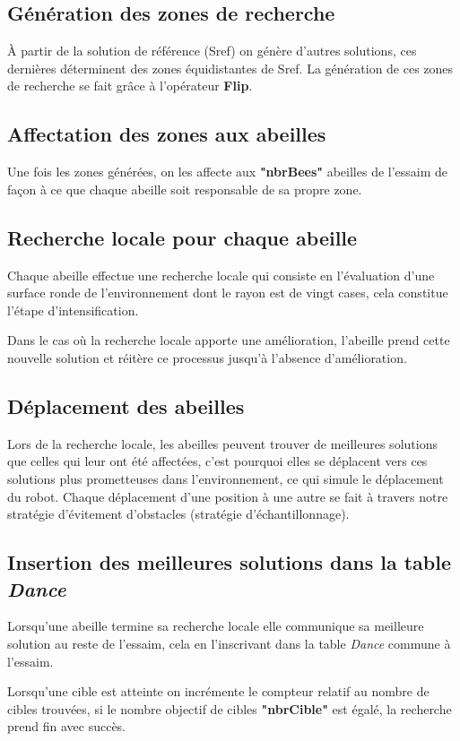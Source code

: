 \subsection{Génération des zones de recherche}
À partir de la solution de référence (Sref) on génère d'autres solutions, ces dernières déterminent des zones équidistantes de Sref. La génération de ces zones de recherche se fait grâce à l'opérateur \textbf{Flip}. 

\subsection{Affectation des zones aux abeilles}
Une fois les zones générées, on les affecte aux \textbf{"nbrBees"} abeilles de l'essaim de façon à ce que chaque abeille soit responsable de sa propre zone. 

\subsection{Recherche locale pour chaque abeille} 
Chaque abeille effectue une recherche locale qui consiste en l'évaluation d'une surface ronde de l'environnement dont le rayon est de vingt cases, cela constitue l'étape d'intensification. 

Dans le cas où la recherche locale apporte une amélioration, l'abeille prend cette nouvelle solution et réitère ce processus jusqu'à l'absence d'amélioration.

\subsection{Déplacement des abeilles}
Lors de la recherche locale, les abeilles peuvent trouver de meilleures solutions que celles qui leur ont été affectées, c'est pourquoi elles se déplacent vers ces solutions plus prometteuses dans l'environnement, ce qui simule le déplacement du robot. Chaque déplacement d'une position à une autre se fait à travers notre stratégie d'évitement d'obstacles (stratégie d'échantillonnage).


\subsection{Insertion des meilleures solutions dans la table \textit{Dance}}
Lorsqu'une abeille termine sa recherche locale elle communique sa meilleure solution au reste de l'essaim, cela en l'inscrivant dans la table \textit{Dance} commune à l'essaim.

Lorsqu'une cible est atteinte on incrémente le compteur relatif au nombre de cibles trouvées, si le nombre objectif de cibles \textbf{"nbrCible"} est égalé, la recherche prend fin avec succès.


